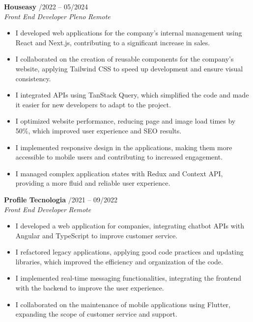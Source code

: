 \documentclass[a4paper,10pt]{article}
\newcommand{\entry}[4]{
  \noindent\textbf{#1} \hfill #2 \\
  \noindent\textit{#3} \hfill \textit{#4} \\
  \vspace{2pt}
}
\begin{document}
\entry{Houseasy}{ /2022 -- 05/2024}
{Front End Developer Pleno}{Remote}
\vspace{-1.6em}
\begin{itemize}
\setlength\itemsep{-0.3em}

\item I developed web applications for the company's internal management using React and Next.js, contributing to a significant increase in sales.
\item I collaborated on the creation of reusable components for the company's website, applying Tailwind CSS to speed up development and ensure visual consistency.
\item I integrated APIs using TanStack Query, which simplified the code and made it easier for new developers to adapt to the project.
\item I optimized website performance, reducing page and image load times by 50\%, which improved user experience and SEO results.
\item I implemented responsive design in the applications, making them more accessible to mobile users and contributing to increased engagement.
\item I managed complex application states with Redux and Context API, providing a more fluid and reliable user experience.

\end{itemize}

\entry{Profile Tecnologia}{ /2021 -- 09/2022}
{Front End Developer}{Remote}
\vspace{-1.6em}
\begin{itemize}
\setlength\itemsep{-0.3em}

\item I developed a web application for companies, integrating chatbot APIs with Angular and TypeScript to improve customer service.

\item I refactored legacy applications, applying good code practices and updating libraries, which improved the efficiency and organization of the code.

\item I implemented real-time messaging functionalities, integrating the frontend with the backend to improve the user experience.

\item I collaborated on the maintenance of mobile applications using Flutter, expanding the scope of customer service and support.

\end{itemize}
\end{document}
